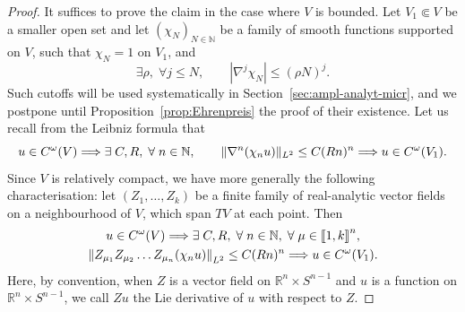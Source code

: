 \documentclass[10pt]{amsart}
\makeatletter
\theoremstyle{definition}\newtheorem{defi}[theo]{Definition}\newtheorem{rema}[theo]{Remark}\newtheorem{exam}[theo]{Example}\newtheorem{exem}[theo]{Example}\newtheorem{nota}[theo]{Notation}
\newcommand\1{\mathds{1}}
\newcommand{\R}{\mathbb{R}}
\newcommand{\N}{\mathbb{N}}
\let\save@mathaccent\mathaccent
\newcommand*\if@single[3]{%
  \setbox0\hbox{${\mathaccent"0362{#1}}^H$}%
  \setbox2\hbox{${\mathaccent"0362{\kern0pt#1}}^H$}%
  \ifdim\ht0=\ht2 #3\else #2\fi
  }
\newcommand*\rel@kern[1]{\kern#1\dimexpr\macc@kerna}
\newcommand*\widebar[1]{\@ifnextchar^{{\wide@bar{#1}{0}}}{\wide@bar{#1}{1}}}
\newcommand*\wide@bar[2]{\if@single{#1}{\wide@bar@{#1}{#2}{1}}{\wide@bar@{#1}{#2}{2}}}
\newcommand*\wide@bar@[3]{%
  \begingroup
  \def\mathaccent##1##2{%
    \let\mathaccent\save@mathaccent
    \if#32 \let\macc@nucleus\first@char \fi
    \setbox\z@\hbox{$\macc@style{\macc@nucleus}_{}$}%
    \setbox\tw@\hbox{$\macc@style{\macc@nucleus}{}_{}$}%
    \dimen@\wd\tw@
    \advance\dimen@-\wd\z@
    \divide\dimen@ 3
    \@tempdima\wd\tw@
    \advance\@tempdima-\scriptspace
    \divide\@tempdima 10
    \advance\dimen@-\@tempdima
    \ifdim\dimen@>\z@ \dimen@0pt\fi
    \rel@kern{0.6}\kern-\dimen@
    \if#31
      \overline{\rel@kern{-0.6}\kern\dimen@\macc@nucleus\rel@kern{0.4}\kern\dimen@}%
      \advance\dimen@0.4\dimexpr\macc@kerna
      \let\final@kern#2%
      \ifdim\dimen@<\z@ \let\final@kern1\fi
      \if\final@kern1 \kern-\dimen@\fi
    \else
      \overline{\rel@kern{-0.6}\kern\dimen@#1}%
    \fi
  }%
  \macc@depth\@ne
  \let\math@bgroup\@empty \let\math@egroup\macc@set@skewchar
  \mathsurround\z@ \frozen@everymath{\mathgroup\macc@group\relax}%
  \macc@set@skewchar\relax
  \let\mathaccentV\macc@nested@a
  \if#31
    \macc@nested@a\relax111{#1}%
  \else
    \def\gobble@till@marker##1\endmarker{}%
    \futurelet\first@char\gobble@till@marker#1\endmarker
    \ifcat\noexpand\first@char A\else
      \def\first@char{}%
    \fi
    \macc@nested@a\relax111{\first@char}%
  \fi
  \endgroup
}
\let\oldbar\bar
\renewcommand*{\bar}[1]{{\mathchoice{\widebar{#1}}{\widebar{#1}}{\widebar{#1}}{\oldbar{#1}}}}
\let\oldexists\exists
\renewcommand*{\exists}{\mathrel{\oldexists}}
\let\oldforall\forall
\renewcommand*{\forall}{\mathrel{\oldforall}}
\newcommand{\llbracket}{\mathopen{[\mkern -2.7mu[}}
\newcommand{\rrbracket}{\mathclose{]\mkern -2.7mu]}}
\renewcommand*{\implies}{\mathchoice{\Longrightarrow}{\Rightarrow}{\Rightarrow}{\Rightarrow}}
\let\originalleft\left
\let\originalright\right
\renewcommand{\left}{\mathopen{}\mathclose\bgroup\originalleft}
\renewcommand{\right}{\aftergroup\egroup\originalright}
\makeatother
\begin{document}
\begin{proof}
It suffices to prove the claim in the case where $V$ is bounded. Let $V_1\Subset V$ be a smaller open set and let $(\chi_N)_{N\in \N}$ be a family of smooth functions supported on $V$, such that $\chi_N=1$ on $V_1$, and
\[
\exists \rho, \;\forall j\leq N,\qquad |\nabla^j\chi_N|\leq (\rho N)^j.
\]
Such cutoffs will be used systematically in Section~\ref{sec:ampl-analyt-micr}, and we postpone until Proposition~\ref{prop:Ehrenpreis} the proof of their existence. Let us recall from the Leibniz formula that
\[
u\in C^{\omega}(V)\implies \; \exists C,R,\; \forall n\in \N,\qquad \|\nabla^n(\chi_nu)\|_{L^2}\leq C(Rn)^n\implies u\in C^{\omega}(V_1).
\]
Since $V$ is relatively compact, we have more generally the following characterisation: let $(Z_1,\dots,Z_k)$ be a finite family of real-analytic vector fields on a neighbourhood of $V$, which span $TV$ at each point. Then
\begin{multline*}
u\in C^{\omega}(V)\implies \;\exists C,R,\;\forall n\in \N, \;\forall \mu\in
\llbracket 1,k\rrbracket^n,\\
\left\|Z_{\mu_1}Z_{\mu_2}\dots Z_{\mu_n}(\chi_nu)\right\|_{L^2}\leq C(Rn)^n\implies u\in C^{\omega}(V_1).
\end{multline*}
Here, by convention, when $Z$ is a vector field on $\R^n\times S^{n-1}$ and $u$ is a function on $\R^n\times S^{n-1}$, we call $Zu$ the Lie derivative of $u$ with respect to $Z$.


\end{proof}
\end{document}
